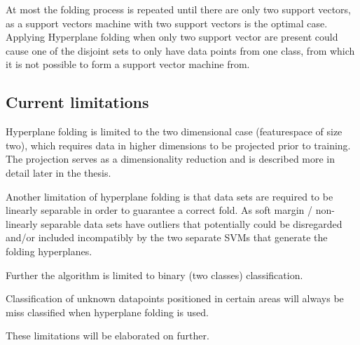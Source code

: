 \documentclass[a4paper,twoside]{bth}
\begin{document}
\par At most the folding process is repeated until there are only two support vectors, as a support vectors machine with two support vectors is the optimal case. Applying Hyperplane folding when only two support vector are present could cause one of the disjoint sets to only have data points from one class, from which it is not possible to form a support vector machine from.

\subsection{Current limitations}
Hyperplane folding is limited to the two dimensional case (featurespace of size two), which requires data in higher dimensions to be projected prior to training. The projection serves as a dimensionality reduction and is described more in detail later in the thesis. 
\par Another limitation of hyperplane folding is that data sets are required to be linearly separable in order to guarantee a correct fold. As soft margin / non-linearly separable data sets have outliers that potentially could be disregarded and/or included incompatibly by the two separate SVMs that generate the folding hyperplanes.
\par Further the algorithm is limited to binary (two classes) classification.
\par Classification of unknown datapoints positioned in certain areas will always be miss classified when hyperplane folding is used.
\par These limitations will be elaborated on further.
\end{document}
